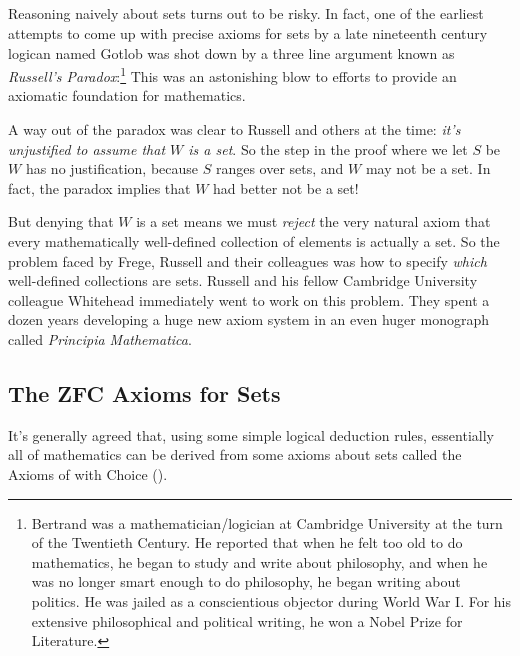 \subsection{}

Reasoning naively about sets turns out to be risky.  In fact, one of the
earliest attempts to come up with precise axioms for sets by a late
nineteenth century logican named Gotlob  was shot down by a three
line argument known as \emph{Russell's Paradox}:\footnote{Bertrand 
  was a mathematician/logician at Cambridge University at the turn of the
  Twentieth Century.  He reported that when he felt too old to do
  mathematics, he began to study and write about philosophy, and when he
  was no longer smart enough to do philosophy, he began writing about
  politics.  He was jailed as a conscientious objector during World War I.
  For his extensive philosophical and political writing, he won a Nobel
  Prize for Literature.}  This was an astonishing blow to efforts to
provide an axiomatic foundation for mathematics.


A way out of the paradox was clear to Russell and others at the time:
\emph{it's unjustified to assume that $W$ is a set}.  So the step in the
proof where we let $S$ be $W$ has no justification, because $S$ ranges
over sets, and $W$ may not be a set.  In fact, the paradox implies that
$W$ had better not be a set!

But denying that $W$ is a set means we must \emph{reject} the very natural
axiom that every mathematically well-defined collection of elements is
actually a set.  So the problem faced by Frege, Russell and their
colleagues was how to specify \emph{which} well-defined collections are
sets.  Russell and his fellow Cambridge University colleague Whitehead
immediately went to work on this problem.  They spent a dozen years
developing a huge new axiom system in an even huger monograph called
\emph{Principia Mathematica}.


\subsection{The ZFC Axioms for Sets}
It's generally agreed that, using some simple logical deduction rules,
essentially all of mathematics can be derived from some axioms about sets
called the Axioms of  with Choice ().

